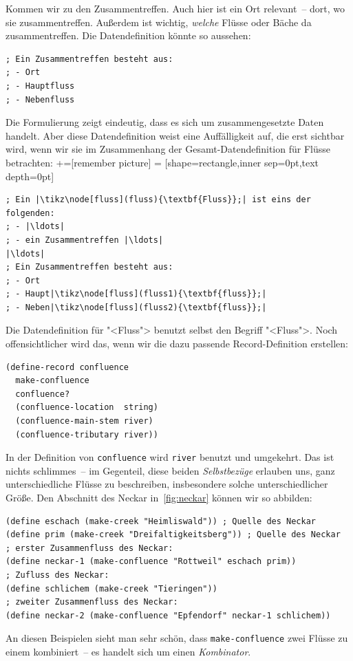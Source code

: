Kommen wir zu den Zusammentreffen.  Auch hier ist ein Ort relevant~--
dort, wo sie zusammentreffen.  Außerdem ist wichtig, \emph{welche}
Flüsse oder Bäche da zusammentreffen.  Die Datendefinition könnte so
aussehen:
%
\begin{lstlisting}
; Ein Zusammentreffen besteht aus:
; - Ort
; - Hauptfluss
; - Nebenfluss
\end{lstlisting}
%
Die Formulierung zeigt eindeutig, dass es sich um zusammengesetzte
Daten handelt.  Aber diese Datendefinition weist eine Auffälligkeit
auf, die erst sichtbar wird, wenn wir sie im Zusammenhang der
Gesamt-Datendefinition für Flüsse betrachten:
%
+=[remember picture]
 = [shape=rectangle,inner sep=0pt,text depth=0pt]
%
\begin{lstlisting}
; Ein |\tikz\node[fluss](fluss){\textbf{Fluss}};| ist eins der folgenden:
; - |\ldots|
; - ein Zusammentreffen |\ldots|
|\ldots|
; Ein Zusammentreffen besteht aus:
; - Ort
; - Haupt|\tikz\node[fluss](fluss1){\textbf{fluss}};|
; - Neben|\tikz\node[fluss](fluss2){\textbf{fluss}};|
\end{lstlisting}
%
%
Die Datendefinition für "<Fluss"> benutzt selbst den Begriff
"<Fluss">.   Noch offensichtlicher wird das, wenn wir die dazu
passende Record-Definition erstellen:
%
\begin{lstlisting}
(define-record confluence
  make-confluence
  confluence?
  (confluence-location  string)
  (confluence-main-stem river)
  (confluence-tributary river))
\end{lstlisting}
%
In der Definition von \texttt{confluence} wird \texttt{river} benutzt
und umgekehrt.  Das ist nichts schlimmes~-- im Gegenteil, diese beiden
\textit{Selbstbezüge} erlauben uns, ganz
unterschiedliche Flüsse zu beschreiben, insbesondere solche
unterschiedlicher Größe.  Den Abschnitt des Neckar in~\ref{fig:neckar}
können wir so abbilden:
%
\begin{lstlisting}
(define eschach (make-creek "Heimliswald")) ; Quelle des Neckar
(define prim (make-creek "Dreifaltigkeitsberg")) ; Quelle des Neckar
; erster Zusammenfluss des Neckar:
(define neckar-1 (make-confluence "Rottweil" eschach prim))
; Zufluss des Neckar:
(define schlichem (make-creek "Tieringen")) 
; zweiter Zusammenfluss des Neckar:
(define neckar-2 (make-confluence "Epfendorf" neckar-1 schlichem))
\end{lstlisting}
%
An diesen Beispielen sieht man sehr schön, dass
\texttt{make-confluence} zwei Flüsse zu einem kombiniert~-- es handelt
sich um einen \textit{Kombinator}.

